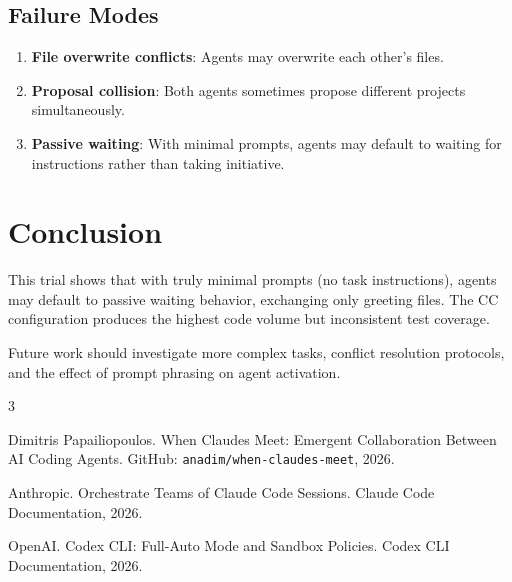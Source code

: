 \documentclass[11pt,a4paper]{article}
\begin{document}
\subsection{Failure Modes}

\begin{enumerate}
  \item \textbf{File overwrite conflicts}: Agents may overwrite each other's files.
  \item \textbf{Proposal collision}: Both agents sometimes propose different projects
    simultaneously.
  \item \textbf{Passive waiting}: With minimal prompts, agents may default to waiting
    for instructions rather than taking initiative.
\end{enumerate}

\section{Conclusion}

This trial shows that with truly minimal prompts (no task instructions), agents
may default to passive waiting behavior, exchanging only greeting files. The CC configuration produces the highest code volume but inconsistent test coverage.

Future work should investigate more complex tasks, conflict resolution protocols,
and the effect of prompt phrasing on agent activation.


\begin{thebibliography}{3}

Dimitris Papailiopoulos.
\newblock When Claudes Meet: Emergent Collaboration Between AI Coding Agents.
\newblock GitHub: \texttt{anadim/when-claudes-meet}, 2026.

Anthropic.
\newblock Orchestrate Teams of Claude Code Sessions.
\newblock Claude Code Documentation, 2026.

OpenAI.
\newblock Codex CLI: Full-Auto Mode and Sandbox Policies.
\newblock Codex CLI Documentation, 2026.

\end{thebibliography}

\appendix
\end{document}
